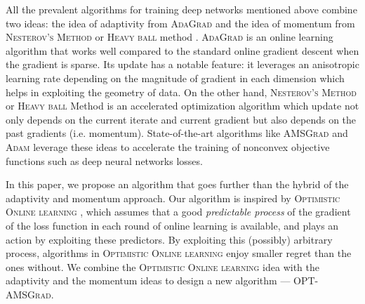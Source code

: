 \documentclass[11pt]{article}
\theoremstyle{k}
\begin{document}
All the prevalent algorithms for training deep networks mentioned above combine two ideas: the idea of adaptivity from \textsc{AdaGrad} \citep{DHS11,MS10} and the idea of momentum from \textsc{Nesterov's  Method} \citep{N04} or \textsc{Heavy ball} method \citep{P64}.
\textsc{AdaGrad} is an online learning algorithm that works well compared to the standard online gradient descent when the gradient is sparse.
Its update has a notable feature: it leverages an anisotropic learning rate depending on the magnitude of gradient in each dimension which helps in exploiting the geometry of data. 
On the other hand, \textsc{Nesterov's Method} or \textsc{Heavy ball} Method \citep{P64} is an accelerated optimization algorithm which update not only depends on the current iterate and current gradient but also depends on the past gradients (i.e. momentum). 
State-of-the-art algorithms like \textsc{AMSGrad} \citep{RKK18} and \textsc{Adam} \citep{KB15} leverage these ideas to accelerate the training of nonconvex objective functions such as deep neural networks losses.

In this paper, we propose an algorithm that goes further than the hybrid of the adaptivity and momentum approach. 
Our algorithm is inspired by \textsc{Optimistic Online learning} \citep{CJ12,rakhlin2013online,SALS15,ALLW18,mertikopoulos2018optimistic}, which assumes that a good \emph{predictable process} of the gradient of the loss function in each round of online learning is available, and plays an action by exploiting these predictors. 
By exploiting this (possibly) arbitrary process, algorithms in \textsc{Optimistic Online learning} enjoy smaller regret than the ones without.
We combine the \textsc{Optimistic Online learning} idea with the adaptivity and the momentum ideas to design a new algorithm --- \textsc{OPT-AMSGrad}. 
\end{document}
